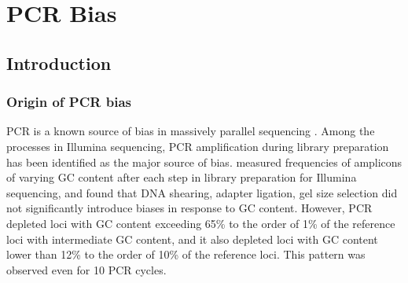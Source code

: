\documentclass[parskip=full, numbers=noenddot]{scrreprt}
\begin{document}

\chapter{PCR Bias}
\label{ch:pcrbias}

\section{Introduction}
\label{sec:pcrbias_intro}

\subsection{Origin of PCR bias}
\label{ssec:pcrbias_intro_origin}

PCR is a known source of bias in massively parallel sequencing \citep{olova_comparison_2018}.  Among the processes in Illumina sequencing, PCR amplification during library preparation has been identified as the major source of bias.
\citet{aird_analyzing_2011} measured frequencies of amplicons of varying GC content after each step in library preparation for Illumina sequencing, and found that DNA shearing, adapter ligation, gel size selection did not significantly introduce biases in response to GC content.  However, PCR depleted loci with GC content exceeding 65\% to the order of 1\% of the reference loci with intermediate GC content, and it also depleted loci with GC content lower than 12\% to the order of 10\% of the reference loci.  This pattern was observed even for 10 PCR cycles.

\end{document}
